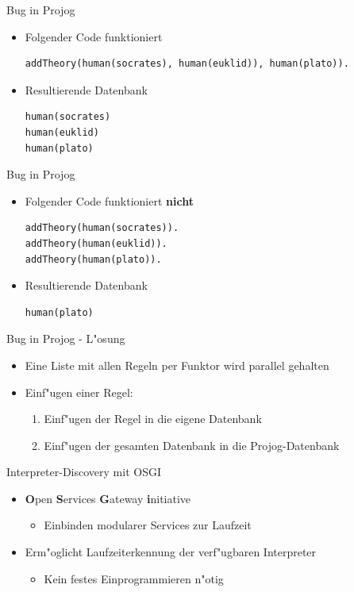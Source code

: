 \documentclass[18pt]{beamer}
\begin{document}
\begin{frame}[fragile]{Bug in Projog}
\begin{itemize}
\item Folgender Code funktioniert
\begin{verbatim}
addTheory(human(socrates), human(euklid)), human(plato)).
\end{verbatim}
\vspace{0.5cm}
\item Resultierende Datenbank
\begin{verbatim}
human(socrates)
human(euklid)
human(plato)
\end{verbatim}
\end{itemize}
\end{frame}
\begin{frame}[fragile]{Bug in Projog}
\begin{itemize}
\item Folgender Code funktioniert \textbf{nicht}
\begin{verbatim}
addTheory(human(socrates)).
addTheory(human(euklid)).
addTheory(human(plato)).
\end{verbatim}
\vspace{0.5cm}
\item Resultierende Datenbank
\begin{verbatim}
human(plato)
\end{verbatim}
\end{itemize}
\end{frame}
\begin{frame}{Bug in Projog - L"osung}
\begin{itemize}
\item Eine Liste mit allen Regeln per Funktor wird parallel gehalten
\vspace{0.5cm}
\item Einf"ugen einer Regel:
\begin{enumerate}
\item Einf"ugen der Regel in die eigene Datenbank
\item Einf"ugen der gesamten Datenbank in die Projog-Datenbank
\end{enumerate}
\end{itemize}
\end{frame}
\begin{frame}{Interpreter-Discovery mit OSGI}
\begin{itemize}
\item \textbf{O}pen \textbf{S}ervices \textbf{G}ateway \textbf{i}nitiative
\begin{itemize}
\item Einbinden modularer Services zur Laufzeit
\end{itemize}
\vspace{0.1cm}
\item Erm"oglicht Laufzeiterkennung der verf"ugbaren Interpreter
\begin{itemize}
\item Kein festes Einprogrammieren n"otig
\end{itemize}
\end{itemize}
\end{frame}
\end{document}
